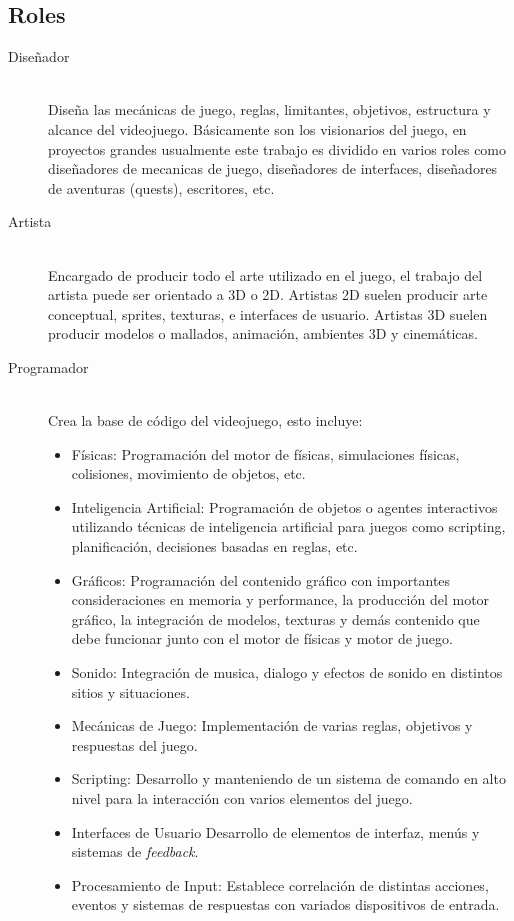 \subsection{Roles}
\small
\begin{description}
\item[Diseñador] \hfill \\
Diseña las mecánicas de juego, reglas, limitantes, objetivos, estructura y alcance del videojuego. Básicamente son los visionarios del juego, en proyectos grandes usualmente este trabajo es dividido en varios roles como diseñadores de mecanicas de juego, diseñadores de interfaces, diseñadores de aventuras (quests), escritores, etc.
\item[Artista] \hfill \\
Encargado de producir todo el arte utilizado en el juego, el trabajo del artista puede ser orientado a 3D o 2D. Artistas 2D suelen producir arte conceptual, sprites, texturas, e interfaces de usuario. Artistas 3D suelen producir modelos o mallados, animación, ambientes 3D y cinemáticas.
\normalsize
\item[Programador] \hfill \\
Crea la base de código del videojuego, esto incluye:
\begin{itemize}
\item Físicas: Programación del motor de físicas, simulaciones físicas, colisiones, movimiento de objetos, etc.
\item Inteligencia Artificial: Programación de objetos o agentes interactivos utilizando técnicas de inteligencia artificial para juegos como scripting, planificación, decisiones basadas en reglas, etc.
\item Gráficos: Programación del contenido gráfico con importantes consideraciones en memoria y performance, la producción del motor gráfico, la integración de modelos, texturas y demás contenido que debe funcionar junto con el motor de físicas y motor de juego.
\item Sonido: Integración de musica, dialogo y efectos de sonido en distintos sitios y situaciones. 
\item Mecánicas de Juego: Implementación de varias reglas, objetivos y respuestas del juego. 
\item Scripting: Desarrollo y manteniendo de un sistema de comando en alto nivel para la interacción con varios elementos del juego.
\item Interfaces de Usuario
Desarrollo de elementos de interfaz, menús y sistemas de \emph{feedback}.
\item Procesamiento de Input: Establece correlación de distintas acciones, eventos y sistemas de respuestas con variados dispositivos de entrada.

\end{itemize}
\end{description}

